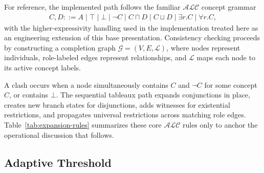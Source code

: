 \documentclass[preprint,12pt,times]{elsarticle}
\begin{document}
For reference, the implemented path follows the familiar $\mathcal{ALC}$ concept grammar
\begin{align}
C, D ::= A \mid \top \mid \bot \mid \neg C \mid C \sqcap D \mid C \sqcup D \mid \exists r.C \mid \forall r.C,
\end{align}
with the higher-expressivity handling used in the implementation treated here as an engineering extension of this base presentation. Consistency checking proceeds by constructing a completion graph $\mathcal{G} = (V,E,\mathcal{L})$, where nodes represent individuals, role-labeled edges represent relationships, and $\mathcal{L}$ maps each node to its active concept labels.

A clash occurs when a node simultaneously contains $C$ and $\neg C$ for some concept $C$, or contains $\bot$. The sequential tableaux path expands conjunctions in place, creates new branch states for disjunctions, adds witnesses for existential restrictions, and propagates universal restrictions across matching role edges. Table~\ref{tab:expansion-rules} summarizes these core $\mathcal{ALC}$ rules only to anchor the operational discussion that follows.

\begin{table}[htbp]
\centering
\caption{Compact $\mathcal{ALC}$ Expansion Rules}
\label{tab:expansion-rules}
\end{table}

\subsection{Adaptive Threshold}
\label{sec:adaptive-formal}
\end{document}
